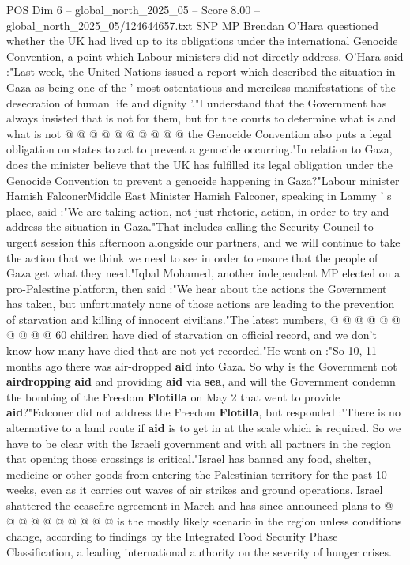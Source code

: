 \begin{textsample}{POS Dim 6 – global\_north\_2025\_05 – Score 8.00 – global\_north\_2025\_05/124644657.txt}
SNP MP Brendan O'Hara questioned whether the UK had lived up to its obligations under the international Genocide Convention, a point which Labour ministers did not directly address.
O'Hara said :"Last week, the United Nations issued a report which described the situation in Gaza as being one of the ' most ostentatious and merciless manifestations of the desecration of human life and dignity '."I understand that the Government has always insisted that is not for them, but for the courts to determine what is and what is not @ @ @ @ @ @ @ @ @ @ the Genocide Convention also puts a legal obligation on states to act to prevent a genocide occurring."In relation to Gaza, does the minister believe that the UK has fulfilled its legal obligation under the Genocide Convention to prevent a genocide happening in Gaza?"Labour minister Hamish FalconerMiddle East Minister Hamish Falconer, speaking in Lammy ' s place, said :"We are taking action, not just rhetoric, action, in order to try and address the situation in Gaza."That includes calling the Security Council to urgent session this afternoon alongside our partners, and we will continue to take the action that we think we need to see in order to ensure that the people of Gaza get what they need."Iqbal Mohamed, another independent MP elected on a pro-Palestine platform, then said :"We hear about the actions the Government has taken, but unfortunately none of those actions are leading to the prevention of starvation and killing of innocent civilians."The latest numbers, @ @ @ @ @ @ @ @ @ @ 60 children have died of starvation on official record, and we don't know how many have died that are not yet recorded."He went on :"So 10, 11 months ago there was air-dropped \textbf{aid} into Gaza.
So why is the Government not \textbf{airdropping} \textbf{aid} and providing \textbf{aid} via \textbf{sea}, and will the Government condemn the bombing of the Freedom \textbf{Flotilla} on May 2 that went to provide \textbf{aid}?"Falconer did not address the Freedom \textbf{Flotilla}, but responded :"There is no alternative to a land route if \textbf{aid} is to get in at the scale which is required.
So we have to be clear with the Israeli government and with all partners in the region that opening those crossings is critical."Israel has banned any food, shelter, medicine or other goods from entering the Palestinian territory for the past 10 weeks, even as it carries out waves of air strikes and ground operations.
Israel shattered the ceasefire agreement in March and has since announced plans to @ @ @ @ @ @ @ @ @ @ is the mostly likely scenario in the region unless conditions change, according to findings by the Integrated Food Security Phase Classification, a leading international authority on the severity of hunger crises.

\end{textsample}
